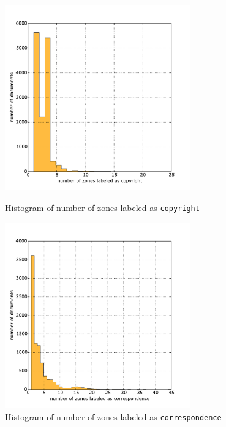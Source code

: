 \begin{figure}
\centering
\begin{minipage}[t!]{0.48\linewidth}
  \includegraphics[width=8cm]{plots/copyright_histogram}
  \caption{Histogram of number of zones labeled as \texttt{copyright}}
  \label{fig:copyright_histogram}
\end{minipage}
\quad
\begin{minipage}[t!]{0.48\linewidth}
  \includegraphics[width=8cm]{plots/correspondence_histogram}
  \caption{Histogram of number of zones labeled as \texttt{correspondence}}
  \label{fig:correspondence_histogram}
\end{minipage}
\end{figure}

